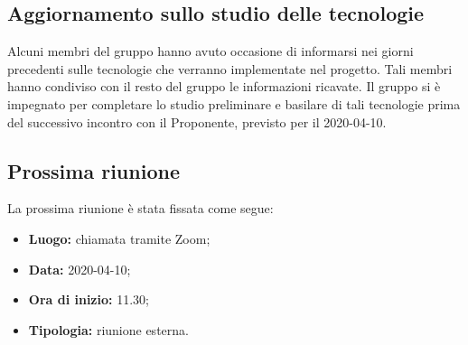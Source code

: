 	\subsection{Aggiornamento sullo studio delle tecnologie}
	Alcuni membri del gruppo hanno avuto occasione di informarsi nei giorni precedenti sulle tecnologie che verranno implementate nel progetto. Tali membri hanno condiviso con il resto del gruppo le informazioni ricavate. Il gruppo si è impegnato per completare lo studio preliminare e basilare di tali tecnologie prima del successivo incontro con il Proponente, previsto per il 2020-04-10.

	\subsection{Prossima riunione}
		La prossima riunione è stata fissata come segue: 
		\begin{itemize}
			\item \textbf{Luogo: } chiamata tramite Zoom; 
			\item \textbf{Data: } 2020-04-10; 
			\item \textbf{Ora di inizio: } 11.30;
			\item \textbf{Tipologia: } riunione esterna.
		\end{itemize}